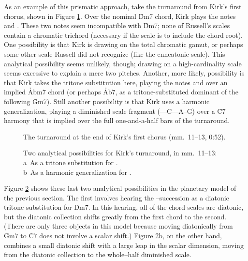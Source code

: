 As an example of this prismatic approach, take the turnaround from Kirk's
first chorus, shown in Figure \ref{csa:first-chorus-turnaround}. Over the
nominal \h{Dm7} chord, Kirk plays the notes \Eflat and \Dflat. These two notes
seem incompatible with \h{Dm7}; none of Russell's scales contain a chromatic
trichord (necessary if the scale is to include the chord root). One
possibility is that Kirk is drawing on the total chromatic gamut, or perhaps
some other scale Russell did not recognize (like the enneatonic scale). This
analytical possibility seems unlikely, though; drawing on a high-cardinality
scale seems excessive to explain a mere two pitches. Another, more likely,
possibility is that Kirk takes the tritone substitution here, playing the
notes \Eflat and \Dflat over an implied \h{Abm7} chord (or perhaps \h{Ab7}, as a
tritone-substituted dominant of the following \h{Gm7}). Still another
possibility is that Kirk uses a harmonic generalization, playing a diminished
scale fragment (\Eflat--\Dflat--C--\Bflat--A--G) over a \h{C7} harmony that is
implied over the full one-and-a-half bars of the turnaround.

\begin{figure}[tbp]
  \caption{The turnaround at the end of Kirk's first chorus (mm.~11--13,
    0:52).}
  \label{csa:first-chorus-turnaround}
\end{figure}

\begin{figure}[tbp]
  \captionsetup{format=hang}
  \caption[Two analytical possibilities for Kirk's turnaround.]{%
    Two analytical possibilities for Kirk's turnaround, in mm.~11--13: \\
    a\rightparen\ As a tritone substitution for . \\
    b\rightparen\ As a harmonic generalization for .}
  \label{csa:turnaround-transformations}
\end{figure}

Figure \ref{csa:turnaround-transformations} shows these last two analytical
possibilities in the planetary model of the previous section. The first
involves hearing the \Eflat--\Dflat succession as a diatonic tritone
substitution for \h{Dm7}. In this hearing, all of the chord-scales
are diatonic, but the diatonic collection shifts greatly from the first chord
to the second. (There are only three objects in this model because moving
diatonically from \h{Gm7} to \h{C7} does not involve a scalar shift.) Figure
\ref{csa:turnaround-transformations}b, on the other hand, combines a small
diatonic shift with a large leap in the scalar dimension, moving from the
diatonic collection to the whole--half diminished scale.

